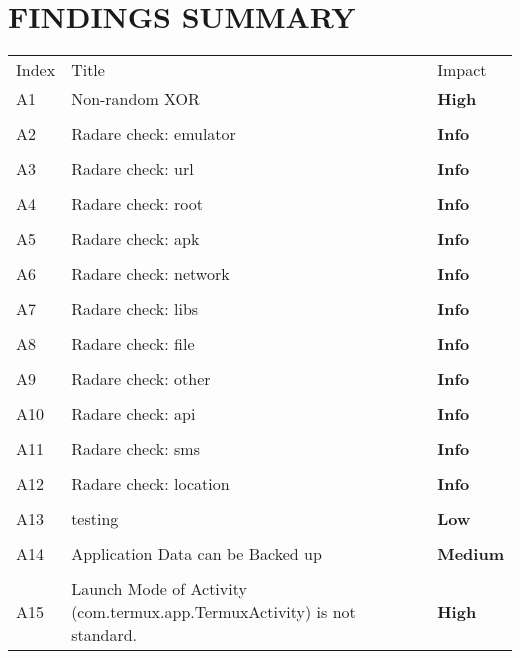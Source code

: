 \documentclass[12p]{article}
\begin{document}
\section{FINDINGS SUMMARY}\label{sec:summary}
	\begin{longtable}{p{0.5cm} p{10cm} p{1.5cm}}
	\rowcolor{grannysmithapple!70} Index & Title & Impact \\
	A1&Non-random XOR& \color{ferrarired}\textbf{High} \\
\hline\\	A2&Radare check: emulator& \color{deepskyblue}\textbf{Info} \\
\hline\\	A3&Radare check: url& \color{deepskyblue}\textbf{Info} \\
\hline\\	A4&Radare check: root& \color{deepskyblue}\textbf{Info} \\
\hline\\	A5&Radare check: apk& \color{deepskyblue}\textbf{Info} \\
\hline\\	A6&Radare check: network& \color{deepskyblue}\textbf{Info} \\
\hline\\	A7&Radare check: libs& \color{deepskyblue}\textbf{Info} \\
\hline\\	A8&Radare check: file& \color{deepskyblue}\textbf{Info} \\
\hline\\	A9&Radare check: other& \color{deepskyblue}\textbf{Info} \\
\hline\\	A10&Radare check: api& \color{deepskyblue}\textbf{Info} \\
\hline\\	A11&Radare check: sms& \color{deepskyblue}\textbf{Info} \\
\hline\\	A12&Radare check: location& \color{deepskyblue}\textbf{Info} \\
\hline\\	A13&testing& \color{amber}\textbf{Low} \\
\hline\\	A14&Application Data can be Backed up& \color{orange(colorwheel)}\textbf{Medium} \\
\hline\\	A15&Launch Mode of Activity \newline (com.termux.app.TermuxActivity) is not standard.& \color{ferrarired}\textbf{High} \\

\end{longtable}
\end{document}
